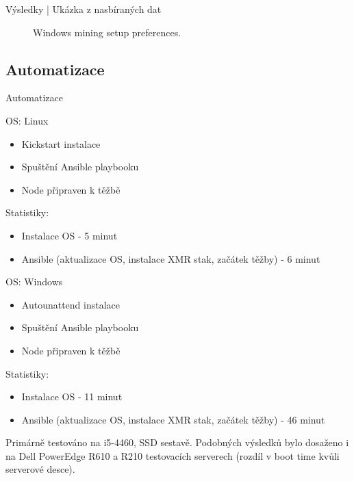 \documentclass{beamer}
\begin{document}
\begin{darkframes}
\begin{frame}{Výsledky | Ukázka z nasbíraných dat}
\begin{center}
\begin{figure}[H]
\caption{Windows mining setup preferences.}
\label{chart:windowshabits}\end{figure}\end{center}

    \end{frame}
    \subsection{Automatizace}
    \begin{frame}{Automatizace}
    
    \begin{multicols}{2}
OS: Linux
\begin{itemize}
\item Kickstart instalace
\item Spuštění Ansible playbooku
\item Node připraven k těžbě
\end{itemize}
Statistiky:
\begin{itemize}
\item Instalace OS - 5 minut
\item Ansible (aktualizace OS, instalace XMR stak, začátek těžby) - 6 minut
\end{itemize}

\columnbreak
OS: Windows
\begin{itemize}
\item Autounattend instalace
\item Spuštění Ansible playbooku
\item Node připraven k těžbě
\end{itemize}
Statistiky:
\begin{itemize}
\item Instalace OS - 11 minut
\item Ansible (aktualizace OS, instalace XMR stak, začátek těžby) - 46 minut
\end{itemize}
\end{multicols}
Primárně testováno na i5-4460, SSD sestavě. Podobných výsledků bylo dosaženo i na Dell PowerEdge R610 a R210 testovacích serverech (rozdíl v boot time kvůli serverové desce).
 

\end{frame}
\end{darkframes}
\end{document}
